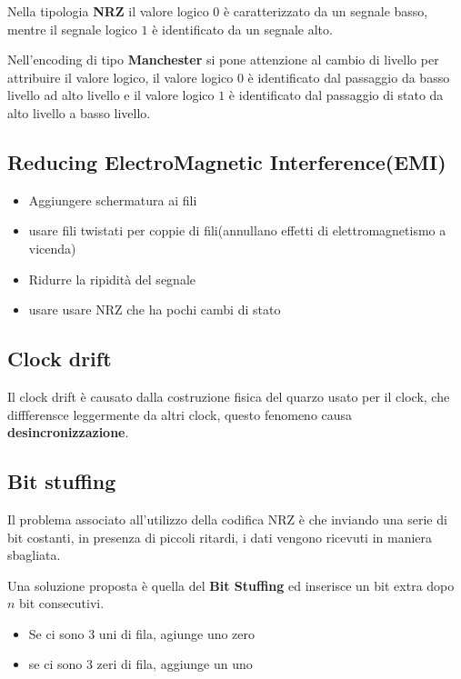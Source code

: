 Nella tipologia \textbf{NRZ} il valore logico $0$ è caratterizzato da un segnale basso, mentre il segnale logico $1$ è identificato da un segnale alto.

Nell'encoding di tipo \textbf{Manchester} si pone attenzione al cambio di livello per attribuire il valore logico, il valore logico $0$ è identificato dal passaggio da basso livello ad alto livello e il valore logico $1$ è identificato dal passaggio di stato da alto livello a basso livello.



\subsection{Reducing ElectroMagnetic Interference(EMI)}

\begin{itemize}
  \item Aggiungere schermatura ai fili
  \item usare fili twistati per coppie di fili(annullano effetti di elettromagnetismo a vicenda)
  \item Ridurre la ripidità del segnale
  \item usare usare NRZ che ha pochi cambi di stato
\end{itemize}

\subsection{Clock drift}

Il clock drift è causato dalla costruzione fisica del quarzo usato per il clock, che diffferensce leggermente da altri clock, questo fenomeno causa \textbf{desincronizzazione}.
\subsection{Bit stuffing}
Il problema associato all'utilizzo della codifica NRZ è che inviando una serie di bit costanti, in presenza di piccoli ritardi, i dati vengono ricevuti in maniera sbagliata.

Una soluzione proposta è quella del \textbf{Bit Stuffing} ed inserisce un bit extra dopo $n$ bit consecutivi.
\begin{itemize}
  \item Se ci sono 3 uni di fila, agiunge uno zero
  \item se ci sono 3 zeri di fila, aggiunge un uno
\end{itemize}


